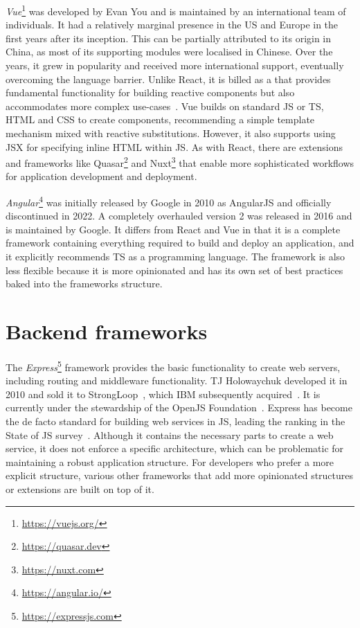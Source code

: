 \emph{Vue}\footnote{\url{https://vuejs.org/}} was developed by Evan You and is maintained by an international team of individuals.
It had a relatively marginal presence in the US and Europe in the first years after its inception.
This can be partially attributed to its origin in China, as most of its supporting modules were localised in Chinese.
Over the years, it grew in popularity and received more international support, eventually overcoming the language barrier.
Unlike React, it is billed as a  that provides fundamental functionality for building reactive components but also accommodates more complex use-cases~\parencite{vueProgressiveFramework}.
Vue builds on standard \ac{JS} or \ac{TS}, \ac{HTML} and \ac{CSS} to create components, recommending a simple template mechanism mixed with reactive substitutions.
However, it also supports using \ac{JSX} for specifying inline \ac{HTML} within \ac{JS}.
As with React, there are extensions and frameworks like Quasar\footnote{\url{https://quasar.dev}} and Nuxt\footnote{\url{https://nuxt.com}} that enable more sophisticated workflows for application development and deployment.

\emph{Angular}\footnote{\url{https://angular.io/}} was initially released by Google in 2010 as AngularJS and officially discontinued in 2022.
A completely overhauled version 2 was released in 2016 and is maintained by Google.
It differs from React and Vue in that it is a complete framework containing everything required to build and deploy an application, and it explicitly recommends \ac{TS} as a programming language.
The framework is also less flexible because it is more opinionated and has its own set of best practices baked into the framework\textquotesingle s structure.

\section{Backend frameworks}
\label{sec:backend-frameworks}

The \emph{Express}\footnote{\url{https://expressjs.com}} framework provides the basic functionality to create web servers, including routing and middleware functionality.
TJ Holowaychuk developed it in 2010 and sold it to StrongLoop~\parencite{expressJsStrongLoop}, which IBM subsequently acquired~\parencite{expressJsStrongLoopIbm}.
It is currently under the stewardship of the OpenJS Foundation~\parencite{expressJsNodeFoundation}.
Express has become the de facto standard for building web services in JS, leading the ranking in the State of JS survey~\parencite{mostUsedBackendFrameworks22}.
Although it contains the necessary parts to create a web service, it does not enforce a specific architecture, which can be problematic for maintaining a robust application structure.
For developers who prefer a more explicit structure, various other frameworks that add more opinionated structures or extensions are built on top of it.

